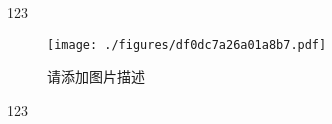 
123


\begin{figure}[ht]
\centering
\texttt{[image: ./figures/df0dc7a26a01a8b7.pdf]}
\caption{请添加图片描述} \label{fig_testdr_1}
\end{figure}

123
